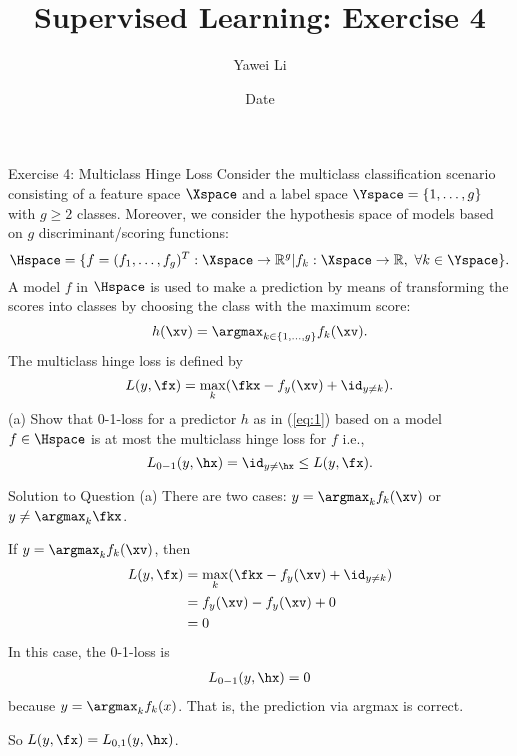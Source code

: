 \documentclass[aspectratio=169]{beamer}
\title[]{\textbf{Supervised Learning: Exercise 4}}
\author{Yawei Li}
\institute[LMU]
{
\\
  \texttt{yawei.li@stat.uni-muenchen.de}
}
\date{Date}
\begin{document}
\begin{frame}
\titlepage

\end{frame}


\begin{frame}{Exercise 4: Multiclass Hinge Loss}
	\small
	Consider the multiclass classification scenario consisting of a feature space $\Xspace$ and a label space $\Yspace = \{1, \ldots, g\}$ with $g \geq 2 $ classes. Moreover, we consider the hypothesis space of models based on $g$ discriminant/scoring functions:
	$$\Hspace = \{ f = (f_1, \ldots, f_g)^T: \Xspace \to \mathbb{R}^g | f_k: \Xspace \to \mathbb{R},  \ \forall k \in \Yspace \}.$$
	A model $f$ in $\Hspace$ is used to make a prediction by means of transforming the scores into classes by choosing the class with the maximum score:
	\begin{align}
		h(\xv) = \argmax_{k \in \{1, \ldots, g \}} f_k(\xv).
		\label{eq:1}
	\end{align} 
	The multiclass hinge loss is defined by $$L(y, \fx) = \max_k (\fkx - f_y(\xv) + \id_{y \neq k}).$$
	(a) Show that 0-1-loss for a predictor $h$ as in (\ref{eq:1}) based on a model $f \in \Hspace$ is at most the multiclass hinge loss for $f$ i.e., $$L_{0-1}(y, \hx) = \id_{y\neq \hx} \leq L(y, \fx).$$
\end{frame}

\begin{frame}{Solution to Question (a)}
	\small
	There are two cases: $y = \argmax_{k} f_k(\xv)$ or $y \neq \argmax_k \fkx$.
	\vspace{10pt}
	
	If $y = \argmax_{k} f_k(\xv)$, then 
	\begin{align*}
		L(y, \fx) 
		&= \max_k (\fkx - f_y(\xv) + \id_{y \neq k}) \\
		& = f_y(\xv) - f_y(\xv) + 0 \\
		&= 0\\
	\end{align*}
	In this case, the 0-1-loss is 
	\begin{align*}
		L_{0-1}(y, \hx) = 0
	\end{align*}
	because $y = \argmax_k f_k(x)$. That is, the prediction via argmax is correct. 
	
	So $L(y, \fx) = L_{0, 1} (y, \hx)$.
\end{frame}
\end{document}
